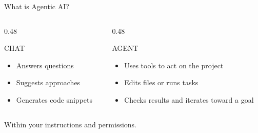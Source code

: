 \documentclass[11pt,aspectratio=169]{beamer}
\begin{document}
\begin{frame}{What is Agentic AI?}
\begin{columns}[t]
\begin{column}[t]{0.48\textwidth}
\begin{block}{CHAT}
\begin{itemize}
    \item Answers questions
    \item Suggests approaches
    \item Generates code snippets
\end{itemize}
\end{block}
\end{column}

\begin{column}[t]{0.48\textwidth}
\begin{block}{AGENT}
\begin{itemize}
    \item Uses tools to act on the project
    \item Edits files or runs tasks
    \item Checks results and iterates toward a goal
\end{itemize}
\end{block}
\end{column}
\end{columns}

\vspace{0.3cm}
\begin{center}
\small Within your instructions and permissions.
\end{center}
\end{frame}
\end{document}
